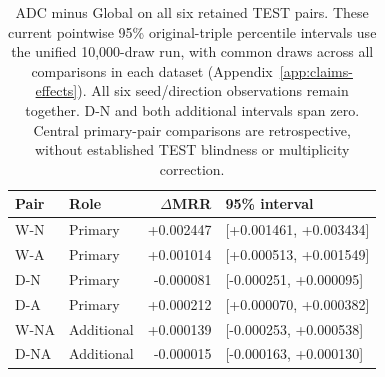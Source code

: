 \begin{table}[htbp]
\centering\footnotesize\setlength{\tabcolsep}{3pt}
\caption{ADC minus Global on all six retained TEST pairs. These current pointwise 95\% original-triple percentile intervals use the unified 10,000-draw run, with common draws across all comparisons in each dataset (Appendix~\ref{app:claims-effects}). All six seed/direction observations remain together. D-N and both additional intervals span zero. Central primary-pair comparisons are retrospective, without established TEST blindness or multiplicity correction.}
\label{tab:claims-intervals}
\begin{tabular}{llrl}
\toprule
Pair & Role & $\Delta$MRR & 95\% interval\\
\midrule
W-N & Primary & +0.002447 & [+0.001461, +0.003434]\\
W-A & Primary & +0.001014 & [+0.000513, +0.001549]\\
D-N & Primary & -0.000081 & [-0.000251, +0.000095]\\
D-A & Primary & +0.000212 & [+0.000070, +0.000382]\\
W-NA & Additional & +0.000139 & [-0.000253, +0.000538]\\
D-NA & Additional & -0.000015 & [-0.000163, +0.000130]\\
\bottomrule
\end{tabular}
\end{table}

